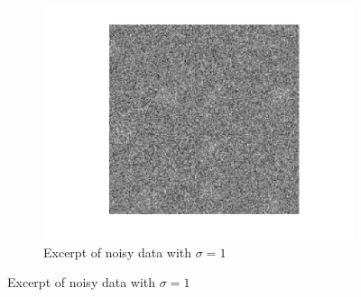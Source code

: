 \documentclass[english,11pt]{article}
\numberwithin{equation}{section}
\theoremstyle{plain}
\theoremstyle{definition}
\theoremstyle{remark}
\theoremstyle{plain}
\theoremstyle{remark}
\theoremstyle{plain}
\theoremstyle{plain}
\begin{document}
\begin{figure}[ht!]
\begin{subfigure}{.5\textwidth}
	\centering
\includegraphics[scale=0.5]{data2D_noisy_1}
\caption{Excerpt of noisy data with $\sigma=1$}
\label{fig:data2D_noisy_1}
\end{subfigure}


\end{figure}
\end{document}
